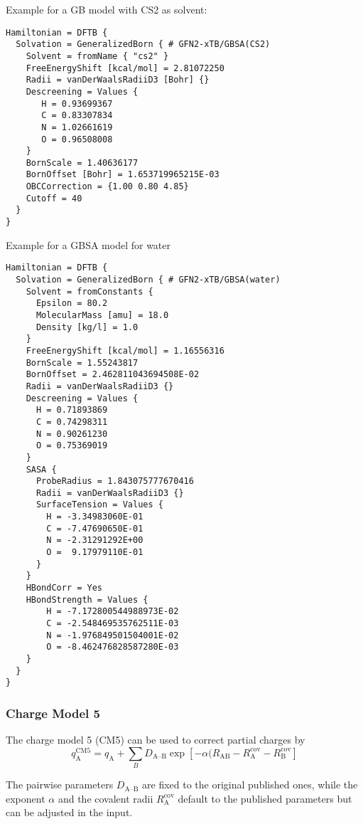 Example for a GB model with CS2 as solvent:

\begin{verbatim}
Hamiltonian = DFTB {
  Solvation = GeneralizedBorn { # GFN2-xTB/GBSA(CS2)
    Solvent = fromName { "cs2" }
    FreeEnergyShift [kcal/mol] = 2.81072250
    Radii = vanDerWaalsRadiiD3 [Bohr] {}
    Descreening = Values {
       H = 0.93699367
       C = 0.83307834
       N = 1.02661619
       O = 0.96508008
    }
    BornScale = 1.40636177
    BornOffset [Bohr] = 1.653719965215E-03
    OBCCorrection = {1.00 0.80 4.85}
    Cutoff = 40
  }
}
\end{verbatim}

Example for a GBSA model for water

\begin{verbatim}
Hamiltonian = DFTB {
  Solvation = GeneralizedBorn { # GFN2-xTB/GBSA(water)
    Solvent = fromConstants {
      Epsilon = 80.2
      MolecularMass [amu] = 18.0
      Density [kg/l] = 1.0
    }
    FreeEnergyShift [kcal/mol] = 1.16556316
    BornScale = 1.55243817
    BornOffset = 2.462811043694508E-02
    Radii = vanDerWaalsRadiiD3 {}
    Descreening = Values {
      H = 0.71893869
      C = 0.74298311
      N = 0.90261230
      O = 0.75369019
    }
    SASA {
      ProbeRadius = 1.843075777670416
      Radii = vanDerWaalsRadiiD3 {}
      SurfaceTension = Values {
        H = -3.34983060E-01
        C = -7.47690650E-01
        N = -2.31291292E+00
        O =  9.17979110E-01
      }
    }
    HBondCorr = Yes
    HBondStrength = Values {
        H = -7.172800544988973E-02
        C = -2.548469535762511E-03
        N = -1.976849501504001E-02
        O = -8.462476828587280E-03
    }
  }
}
\end{verbatim}


\subsubsection{Charge Model 5}
\label{sec:dftbp.CM5}

The charge model 5 (CM5)\cite{marenich2012} can be used to correct partial charges by
%
\begin{equation}
   q^\text{CM5}_\text{A} = q_\text{A}
   + \sum_{B} D_\text{A--B} \exp[-\alpha(R_\text{AB} - R^\text{cov}_\text{A} - R^\text{cov}_\text{B}]
\end{equation}

The pairwise parameters $D_\text{A--B}$ are fixed to the original published ones,
while the exponent $\alpha$ and the covalent radii $R^\text{cov}_\text{A}$ default
to the published parameters but can be adjusted in the input.


